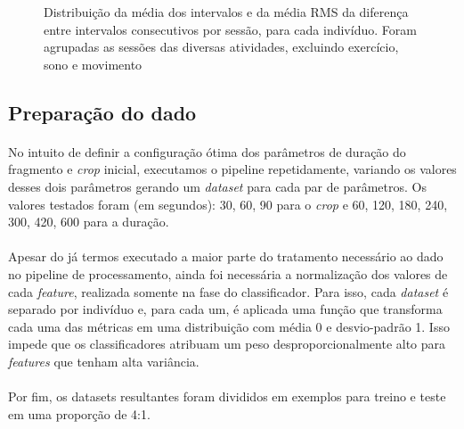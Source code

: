             \begin{figure}[h!]
                \centering
                \caption{Distribuição da média dos intervalos e da média RMS da diferença entre intervalos consecutivos por sessão, para cada indivíduo. Foram agrupadas as sessões das diversas atividades, excluindo exercício, sono e movimento}
                \label{sess_box_all}
            \end{figure}

        \subsection{Preparação do dado}
        
            \paragraph{} No intuito de definir a configuração ótima dos parâmetros de duração do fragmento e \textit{crop} inicial, executamos o pipeline repetidamente, variando os valores desses dois parâmetros gerando um \textit{dataset} para cada par de parâmetros. Os valores testados foram (em segundos): 30, 60, 90 para o \textit{crop} e 60, 120, 180, 240, 300, 420, 600 para a duração.
        
            \paragraph{} Apesar do já termos executado a maior parte do tratamento necessário ao dado no pipeline de processamento, ainda foi necessária a normalização dos valores de cada \textit{feature}, realizada somente na fase do classificador. Para isso, cada \textit{dataset} é separado por indivíduo e, para cada um, é aplicada uma função que transforma cada uma das métricas em uma distribuição com média 0 e desvio-padrão 1. Isso impede que os classificadores atribuam um peso desproporcionalmente alto para \textit{features} que tenham alta variância.
            
            \paragraph{} Por fim, os datasets resultantes foram divididos em exemplos para treino e teste em uma proporção de 4:1. 
            
